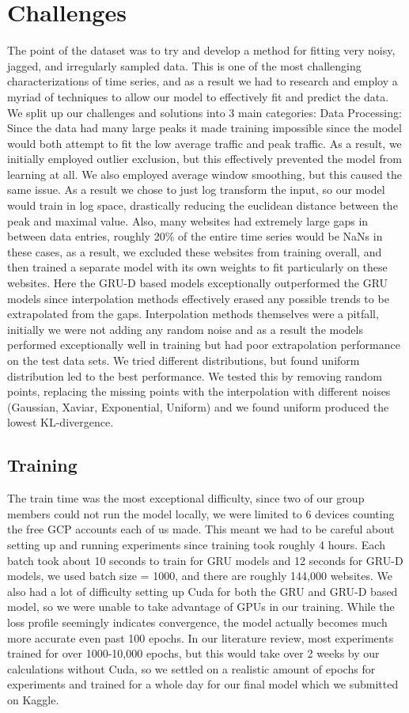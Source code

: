 \documentclass{article} %
\begin{document}
\section{Challenges}
The point of the dataset was to try and develop a method for fitting very noisy, jagged, and irregularly sampled data. This is one of the most challenging characterizations of time series, and as a result we had to research and employ a myriad of techniques to allow our model to effectively fit and predict the data. We split up our challenges and solutions into 3 main categories:
Data Processing:
Since the data had many large peaks it made training impossible since the model would both attempt to fit the low average traffic and peak traffic. As a result, we initially employed outlier exclusion, but this effectively prevented the model from learning at all. We also employed average window smoothing, but this caused the same issue. As a result we chose to just log transform the input, so our model would train in log space, drastically reducing the euclidean distance between the peak and maximal value. Also, many websites had extremely large gaps in between data entries, roughly 20\% of the entire time series would be NaNs in these cases, as a result, we excluded these websites from training overall, and then trained a separate model with its own weights to fit particularly on these websites. Here the GRU-D based models exceptionally outperformed the GRU models since interpolation methods effectively erased any possible trends to be extrapolated from the gaps. Interpolation methods themselves were a pitfall, initially we were not adding any random noise and as a result the models performed exceptionally well in training but had poor extrapolation performance on the test data sets. We tried different distributions, but found uniform distribution led to the best performance. We tested this by removing random points, replacing the missing points with the interpolation with different noises (Gaussian, Xaviar, Exponential, Uniform) and we found uniform produced the lowest KL-divergence.

\subsection{Training}
The train time was the most exceptional difficulty, since two of our group members could not run the model locally, we were limited to 6 devices counting the free GCP accounts each of us made. This meant we had to be careful about setting up and running experiments since training took roughly 4 hours. Each batch took about 10 seconds to train for GRU models and 12 seconds for GRU-D models, we used batch size = 1000, and there are roughly 144,000 websites. We also had a lot of difficulty setting up Cuda for both the GRU and GRU-D based model, so we were unable to take advantage of GPUs in our training. While the loss profile seemingly indicates convergence, the model actually becomes much more accurate even past 100 epochs. In our literature review, most experiments trained for over 1000-10,000 epochs, but this would take over 2 weeks by our calculations without Cuda, so we settled on a realistic amount of epochs for experiments and trained for a whole day for our final model which we submitted on Kaggle. 
\end{document}

